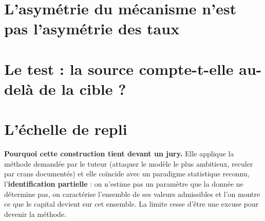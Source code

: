 \section{L'asymétrie du mécanisme n'est pas l'asymétrie des taux}


\section{Le test : la source compte-t-elle au-delà de la cible ?}


\section{L'échelle de repli}

%

\begin{cle}
\textbf{Pourquoi cette construction tient devant un jury.} Elle applique la méthode demandée
par le tuteur (attaquer le modèle le plus ambitieux, reculer par crans documentés) et elle
coïncide avec un paradigme statistique reconnu, l'\textbf{identification partielle} : on
n'estime pas un paramètre que la donnée ne détermine pas, on caractérise l'ensemble de ses
valeurs admissibles et l'on montre ce que le capital devient sur cet ensemble. La limite
cesse d'être une excuse pour devenir la méthode.
\end{cle}
